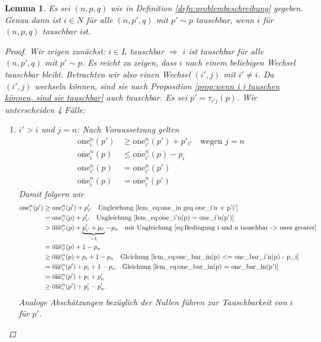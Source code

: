 \documentclass[12pt]{article}
\newtheorem{lem}[thm]{Lemma}
\begin{document}
\begin{lem}
Es sei $(n, p, q)$ wie in Definition \ref{defn:problembeschreibung} gegeben. Genau dann ist $i\in N$ für alle $(n, p', q)$ mit $p'\sim p$ tauschbar, wenn $i$ für $(n, p, q)$ tauschbar ist.
\begin{proof}
Wir zeigen zunächst: $i\in L$ tauschbar $\Rightarrow$ $i$ ist tauschbar für alle $(n, p', q)$ mit $p'\sim p$. Es reicht zu zeigen, dass $i$ nach einem beliebigen Wechsel tauschbar bleibt.
Betrachten wir also einen Wechsel $(i', j)$ mit $i'\neq i$.
Da $(i', j)$ wechseln können, sind sie nach Proposition \ref{prop:wenn i j tauschen können, sind sie tauschbar} auch tauschbar. Es sei $p' = \tau_{i'j}(p)$.
Wir unterscheiden 4 Fälle:
\begin{enumerate}

\item
$i'>i$ und $j=n$: Nach Voraussetzung gelten
\begin{align}
\mathrm{one}_{i}^{n}(p')
&\geq
\mathrm{one}_{i'}^{n}(p')
+
p'_{i'}
\quad\textrm{wegen }j=n
\label{lem_eq:one_in geq one_i'n + p'i'}
\\
\overline{\mathrm{one}}_{i}^{n}(p)
&\leq
\overline{\mathrm{one}}_{i'}^{n}(p)
-
p_{i}
\label{lem_eq:one_bar_in(p) <= one_bar_i'n(p) - p_i}
\\
\mathrm{one}_{i'}^{n}(p)
&=
\mathrm{one}_{i'}^{n}(p')
\label{lem_eq:one_i'n(p) = one_i'n(p')}
\\
\overline{\mathrm{one}}_{i}^{n}(p)
&=
\overline{\mathrm{one}}_{i}^{n}(p')
\label{lem_eq:one_bar_in(p) = one_bar_in(p')}
\end{align}
Damit folgern wir
\begin{align*}
\mathrm{one}_{i}^{n}(p')
&\geq
\mathrm{one}_{i'}^{n}(p')
+
p'_{i'}
\quad\textrm{Ungleichung \ref{lem_eq:one_in geq one_i'n + p'i'}}
\\
&=
\mathrm{one}_{i'}^{n}(p)
+
p'_{i'}
\quad\textrm{Ungleichung \ref{lem_eq:one_i'n(p) = one_i'n(p')}}
\\
&>
\overline{\mathrm{one}}_{i'}^{n}(p)
+
\underbrace{p'_{i'}+p_{i'}}_{=1}-p_n
\quad \textrm{mit Ungleichung \ref{eq:Bedingung i und n tauschbar -> ones greater}}
\\
&=
\overline{\mathrm{one}}_{i'}^{n}(p)
+
1-p_n
\\
&\geq
\overline{\mathrm{one}}_{i}^{n}(p)
+p_i
+
1-p_n
\quad\textrm{Gleichung \ref{lem_eq:one_bar_in(p) <= one_bar_i'n(p) - p_i}}
\\
&=
\overline{\mathrm{one}}_{i}^{n}(p')
+p_i
+
1-p_n
\quad\textrm{Gleichung \ref{lem_eq:one_bar_in(p) = one_bar_in(p')}}
\\
&=
\overline{\mathrm{one}}_{i}^{n}(p')
+p_i
+
p'_n
\\
&\geq
\overline{\mathrm{one}}_i^{n}(p')
+
p'_i-p'_n.
\end{align*}
Analoge Abschätzungen bezüglich der Nullen führen zur Tauschbarkeit von $i$ für $p'$.


\end{enumerate}
\end{proof}
\end{lem}
\end{document}
